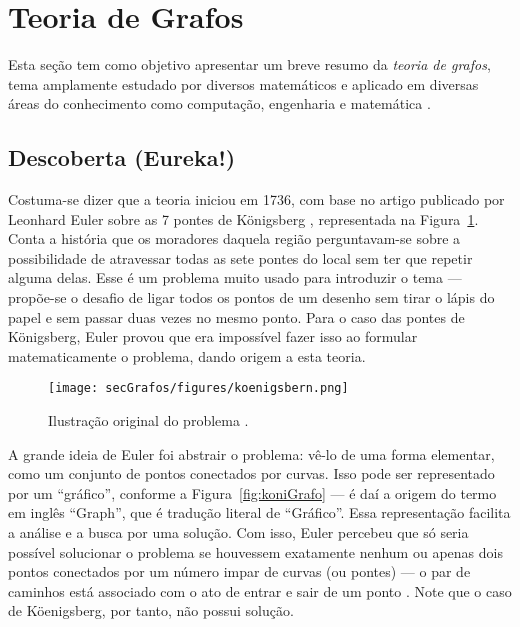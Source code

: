 \section{Teoria de Grafos\label{sec:grafos}}
Esta seção tem como objetivo apresentar um breve resumo da \textit{teoria de grafos}, tema amplamente estudado por diversos matemáticos e aplicado em diversas áreas do conhecimento como computação, engenharia e matemática \cite{graphTheoryApplicationsBondy}.

\subsection{Descoberta (Eureka!)}
Costuma-se dizer que a teoria iniciou em 1736, com base no artigo publicado por Leonhard Euler sobre as 7 pontes de Königsberg \cite{euler:KOENIGSBERG} \cite{graphTheoryApplicationsBondy}, representada na Figura~\ref{fig:koni}. Conta a história que os moradores daquela região perguntavam-se sobre a possibilidade de atravessar todas as sete pontes do local sem ter que repetir alguma delas. Esse é um problema muito usado para introduzir o tema \cite{problemsInMath} --- propõe-se o desafio de ligar todos os pontos de um desenho sem tirar o lápis do papel e sem passar duas vezes no mesmo ponto. Para o caso das pontes de Königsberg, Euler provou que era impossível fazer isso ao formular matematicamente o problema, dando origem a esta teoria.

\begin{figure}[H]
	\begin{center}
		\texttt{[image: secGrafos/figures/koenigsbern.png]}
	\end{center}
	\caption{Ilustração original do problema \cite{euler:KOENIGSBERG}.}
	\label{fig:koni}
\end{figure}

A grande ideia de Euler foi abstrair o problema: vê-lo de uma forma elementar, como um conjunto de pontos conectados por curvas. Isso pode ser representado por um ``gráfico'', conforme a Figura~\ref{fig:koniGrafo} --- é daí a origem do termo em inglês ``Graph'', que é tradução literal de ``Gráfico''. Essa representação facilita a análise e a busca por uma solução. Com isso, Euler percebeu que só seria possível solucionar o problema se houvessem exatamente nenhum ou apenas dois pontos conectados por um número impar de curvas (ou pontes) --- o par de caminhos está associado com o ato de entrar e sair de um ponto \cite{euler:KOENIGSBERG}. Note que o caso de Köenigsberg, por tanto, não possui solução.

